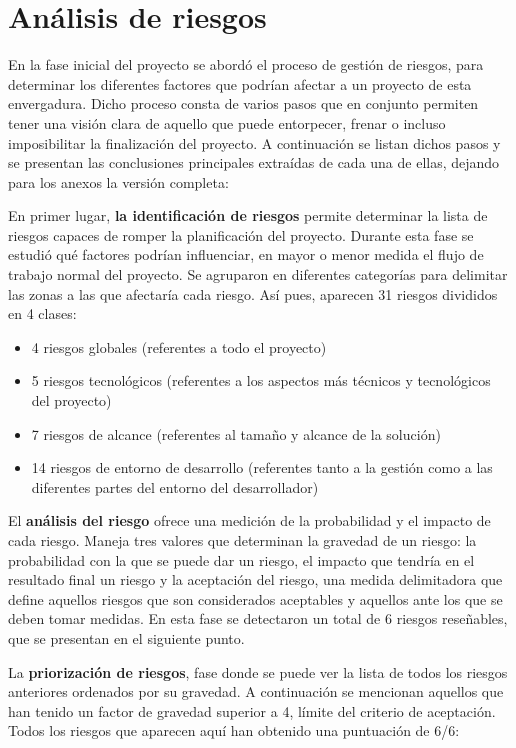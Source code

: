 \section{Análisis de riesgos}  \label{analisis.riesgos}
En la fase inicial del proyecto se abordó el proceso de gestión de riesgos, para determinar los diferentes factores que podrían afectar a un proyecto de esta envergadura. Dicho proceso consta de varios pasos que en conjunto permiten tener una visión clara de aquello que puede entorpecer, frenar o incluso imposibilitar la finalización del proyecto. A continuación se listan dichos pasos y se presentan las conclusiones principales extraídas de cada una de ellas, dejando para los anexos la versión completa: 
\par En primer lugar, \textbf{la identificación de riesgos} permite determinar la lista de riesgos capaces de romper la planificación del proyecto. Durante esta fase se estudió qué factores podrían influenciar, en mayor o menor medida el flujo de trabajo normal del proyecto. Se agruparon en diferentes categorías para delimitar las zonas a las que afectaría cada riesgo. Así pues, aparecen 31 riesgos divididos en 4 clases:
\begin{itemize}
\item 4 riesgos globales (referentes a todo el proyecto)
\item 5 riesgos tecnológicos (referentes a los aspectos más técnicos y tecnológicos del proyecto)
\item 7 riesgos de alcance (referentes al tamaño y alcance de la solución)
\item 14 riesgos de entorno de desarrollo (referentes tanto a la gestión como a las diferentes partes del entorno del desarrollador)
\end{itemize}
\par El \textbf{análisis del riesgo} ofrece una medición de la probabilidad y el impacto de cada riesgo. Maneja tres valores que determinan la gravedad de un riesgo: la probabilidad con la que se puede dar un riesgo, el impacto que tendría en el resultado final un riesgo y la aceptación del riesgo, una medida delimitadora que define aquellos riesgos que son considerados aceptables y aquellos ante los que se deben tomar medidas. En esta fase se detectaron un total de 6 riesgos reseñables, que se presentan en el siguiente punto.
\par La \textbf{priorización de riesgos}, fase donde se puede ver la lista de todos los riesgos anteriores ordenados por su gravedad. A continuación se mencionan aquellos que han tenido un factor de gravedad superior a 4, límite del criterio de aceptación. Todos los riesgos que aparecen aquí han obtenido una puntuación de 6/6: 
